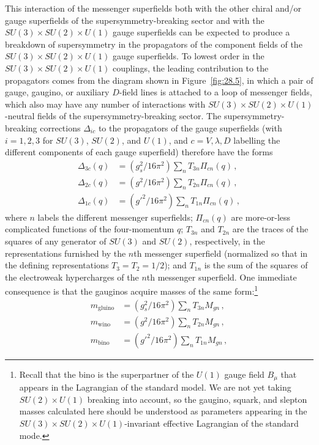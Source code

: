This interaction of the messenger superfields both with the other chiral
and/or gauge superfields of the supersymmetry-breaking sector and with the
\(SU(3)\times SU(2)\times U(1)\) gauge superfields can be
expected to produce a breakdown of supersymmetry in the propagators of the
component fields of the
\(SU(3)\times SU(2)\times U(1)\) gauge superfields. To
lowest order in the \(SU(3)\times SU(2)\times U(1)\)
couplings, the leading contribution to the propagators comes from the
diagram shown in Figure~\ref{fig:28.5}, in which a pair of gauge, gaugino,
or auxiliary \(D\)-field lines is attached to a loop of messenger fields,
which also may have any number of interactions with
\(SU(3)\times SU(2)\times U(1)\)-neutral fields of the
supersymmetry-breaking sector. The supersymmetry-breaking corrections
\(\Delta_{ic}\) to the propagators of the gauge superfields (with
\(i=1,2,3\) for \(SU(3)\), \(SU(2)\), and \(U(1)\), and
\(c=V,\lambda,D\) labelling the different components of each gauge
superfield) therefore have the forms
\begin{equation}
  \begin{aligned}
    \Delta_{3c}(q)
      &=(g_s^2/16\pi^2)\sum_n T_{3n}\Pi_{cn}(q)\,,\\
    \Delta_{2c}(q)
      &=(g^2/16\pi^2)\sum_n T_{2n}\Pi_{cn}(q)\,,\\
    \Delta_{1c}(q)
      &=(g'^2/16\pi^2)\sum_n T_{1n}\Pi_{cn}(q)\,,
  \end{aligned}
  \tag{28.6.1}\label{eq:28.6.1}
\end{equation}
where \(n\) labels the different messenger superfields; \(\Pi_{cn}(q)\)
are more-or-less complicated functions of the four-momentum \(q\);
\(T_{3n}\) and \(T_{2n}\) are the traces of the squares of any generator of
\(SU(3)\) and \(SU(2)\), respectively, in the representations furnished by
the \(n\)th messenger superfield (normalized so that in the defining
representations \(T_3=T_2=1/2\)); and \(T_{1n}\) is the sum of the squares
of the electroweak hypercharges of the \(n\)th messenger superfield. One
immediate consequence is that the gauginos acquire masses of the same
form:\footnote{Recall that the bino is the superpartner of the \(U(1)\)
gauge field \(B_\mu\) that appears in the Lagrangian of the standard model.
We are not yet taking \(SU(2)\times U(1)\) breaking into account,
so the gaugino, squark, and slepton masses calculated here should be
understood as parameters appearing in the
\(SU(3)\times SU(2)\times U(1)\)-invariant effective
Lagrangian of the standard mode.}
\begin{equation}
  \begin{aligned}
    m_{\mathrm{gluino}}
      &=(g_s^2/16\pi^2)\sum_n T_{3n}M_{gn}\,,\\
    m_{\mathrm{wino}}
      &=(g^2/16\pi^2)\sum_n T_{2n}M_{gn}\,,\\
    m_{\mathrm{bino}}
      &=(g'^2/16\pi^2)\sum_n T_{1n}M_{gn}\,,
  \end{aligned}
  \tag{28.6.2}\label{eq:28.6.2}
\end{equation}
